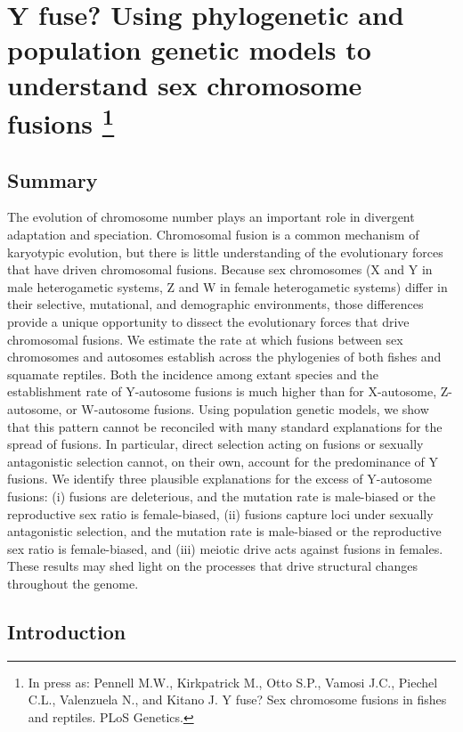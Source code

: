 \chapter[Y fuse? Using phylogenetic and population genetic models to understand sex chromosome fusions]{Y fuse? Using phylogenetic and population genetic models to understand sex chromosome fusions \footnote{In press as: Pennell M.W., Kirkpatrick M., Otto S.P., Vamosi J.C., Piechel C.L., Valenzuela N., and Kitano J. Y fuse? Sex chromosome fusions in fishes and reptiles. PLoS Genetics.}}
\label{chap:sexchrom}

\section{Summary}

The evolution of chromosome number plays an important role in divergent adaptation and speciation. Chromosomal fusion is a common mechanism of karyotypic evolution, but there is little understanding of the evolutionary forces that have driven chromosomal fusions. Because sex chromosomes (X and Y in male heterogametic systems, Z and W in female heterogametic systems) differ in their selective, mutational, and demographic environments, those differences provide a unique opportunity to dissect the evolutionary forces that drive chromosomal fusions. We estimate the rate at which fusions between sex chromosomes and autosomes establish across the phylogenies of both fishes and squamate reptiles. Both the incidence among extant species and the establishment rate of Y-autosome fusions is much higher than for X-autosome, Z-autosome, or W-autosome fusions. Using population genetic models, we show that this pattern cannot be reconciled with many standard explanations for the spread of fusions. In particular, direct selection acting on fusions or sexually antagonistic selection cannot, on their own, account for the predominance of Y fusions. We identify three plausible explanations for the excess of Y-autosome fusions: (i) fusions are deleterious, and the mutation rate is male-biased or the reproductive sex ratio is female-biased, (ii) fusions capture loci under sexually antagonistic selection, and the mutation rate is male-biased or the reproductive sex ratio is female-biased, and (iii) meiotic drive acts against fusions in females. These results may shed light on the processes that drive structural changes throughout the genome.

\section{Introduction}


